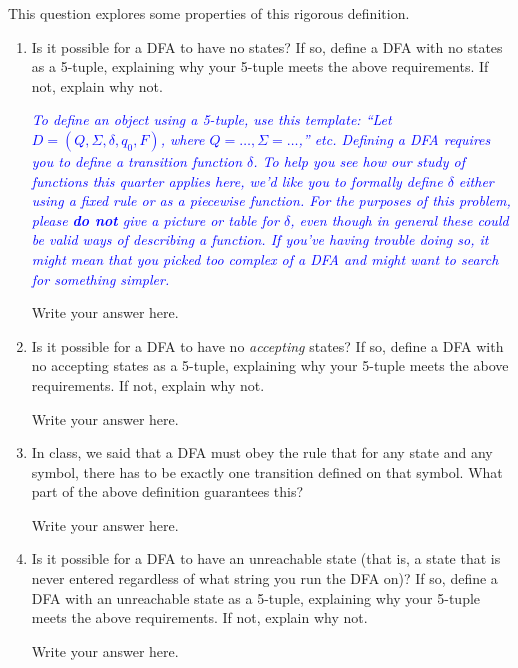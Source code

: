 \documentclass{article}
\renewcommand{\(}{\left(}
\renewcommand{\)}{\right)}
\theoremstyle{plain}
\theoremstyle{plain}
\theoremstyle{definition}
\newcommand{\annotate}[1]{\textit{\textcolor{blue}{#1}}}
\begin{document}
This question explores some properties of this rigorous definition.

\begin{enumerate}[label*=\roman*.,ref=\roman*]
    \item Is it possible for a DFA to have no states? If so, define a DFA with no states as a 5-tuple, explaining why your 5-tuple meets the above requirements. If not, explain why not.
    
    \annotate{To define an object using a 5-tuple, use this template: ``Let $D = (Q, \Sigma, \delta, q_0, F)$, where $Q = \dots, \Sigma = \dots$,'' etc. Defining a DFA requires you to define a transition function $\delta$. To help you see how our study of functions this quarter applies here, we'd like you to formally define $\delta$ either using a fixed rule or as a piecewise function. For the purposes of this problem, please \textbf{do not} give a picture or table for $\delta$, even though in general these could be valid ways of describing a function. If you've having trouble doing so, it might mean that you picked too complex of a DFA and might want to search for something simpler.}
    
    \begin{shaded}
    Write your answer here.
    \end{shaded}
    
    \item Is it possible for a DFA to have no \textit{accepting} states? If so, define a DFA with no accepting states as a 5-tuple, explaining why your 5-tuple meets the above requirements. If not, explain why not.
    
    \begin{shaded}
    Write your answer here.
    \end{shaded}
    
    \item In class, we said that a DFA must obey the rule that for any state and any symbol, there has to be exactly one transition defined on that symbol. What part of the above definition guarantees this?
    
    \begin{shaded}
    Write your answer here.
    \end{shaded}
    
    \item Is it possible for a DFA to have an unreachable state (that is, a state that is never entered regardless of what string you run the DFA on)? If so, define a DFA with an unreachable state as a 5-tuple, explaining why your 5-tuple meets the above requirements. If not, explain why not.
    
    \begin{shaded}
    Write your answer here.
    \end{shaded}
\end{enumerate}
\end{document}
